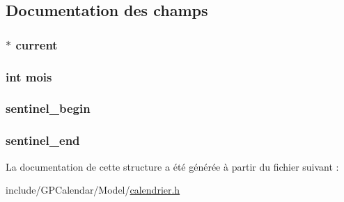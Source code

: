 \subsection{Documentation des champs}
\hypertarget{struct_list_jour_ac67b6c04656e03ceefbfd375d8f63a9e}{
\subsubsection[{current}]{$\ast$ current}}\label{struct_list_jour_ac67b6c04656e03ceefbfd375d8f63a9e}
\hypertarget{struct_list_jour_af4d47133f30c1a134b6cecf5cedd7db9}{
\subsubsection[{mois}]{\setlength{\rightskip}{0pt plus 5cm}int mois}}\label{struct_list_jour_af4d47133f30c1a134b6cecf5cedd7db9}
\hypertarget{struct_list_jour_ae0b0389d82fac1c68ddbb3a3cdcbd194}{
\subsubsection[{sentinel\-\_\-begin}]{ sentinel\-\_\-begin}}\label{struct_list_jour_ae0b0389d82fac1c68ddbb3a3cdcbd194}
\hypertarget{struct_list_jour_a0d872681cde96effd5a33a06062ceffd}{
\subsubsection[{sentinel\-\_\-end}]{ sentinel\-\_\-end}}\label{struct_list_jour_a0d872681cde96effd5a33a06062ceffd}


La documentation de cette structure a été générée à partir du fichier suivant \-:\begin{DoxyCompactItemize}
\item 
include/\-G\-P\-Calendar/\-Model/\hyperlink{calendrier_8h}{calendrier.\-h}\end{DoxyCompactItemize}
